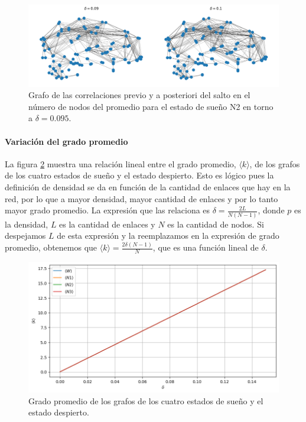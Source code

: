 \documentclass{article}
\begin{document}
\begin{figure}[ht]
	\centering
	\includegraphics[width= \linewidth]{grafoSaltoN2.png}
	\caption{Grafo de las correlaciones previo y a posteriori del salto en el número de nodos del promedio para el estado de sueño N2 en torno a $\delta = 0.095$.
	}
	\label{fg:grafoSaltoN2}
\end{figure}


\paragraph*{Variación del grado promedio}

La figura \ref{fg:gradoPromedio} muestra una relación lineal entre el grado promedio, $\langle k \rangle$, de los grafos de los cuatro estados de sueño y el estado despierto.
Esto es lógico pues la definición de densidad se da en función de la cantidad de enlaces que hay en la red, por lo que a mayor densidad, mayor cantidad de enlaces y por lo tanto mayor grado promedio.
La expresión que las relaciona es $\delta = \frac{2L}{N(N-1)}$, donde $p$ es la densidad, $L$ es la cantidad de enlaces y $N$ es la cantidad de nodos. Si despejamos $L$ de esta expresión y la reemplazamos en la expresión de grado promedio, obtenemos que $\langle k \rangle = \frac{2 \delta (N-1)}{N}$, que es una función lineal de $\delta$.

\begin{figure}[ht]
	\centering
	\includegraphics[width= 0.8\linewidth]{gradoPromedio.png}
	\caption{Grado promedio de los grafos de los cuatro estados de sueño y el estado despierto.
	}
	\label{fg:gradoPromedio}
\end{figure}
\end{document}
